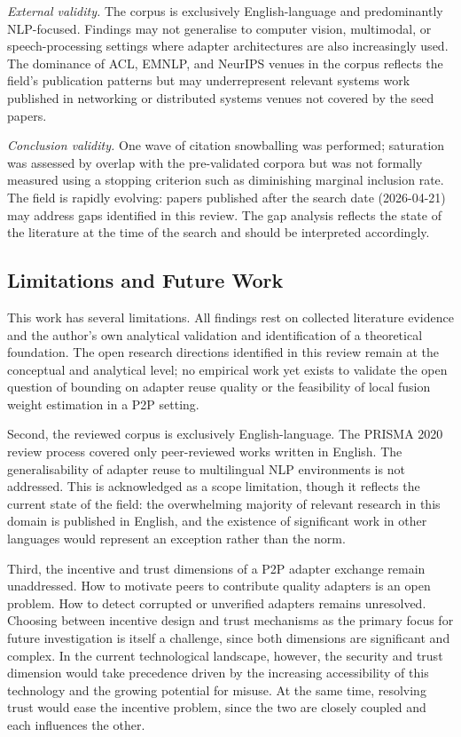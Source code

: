 \textit{External validity.}
The corpus is exclusively English-language and predominantly NLP-focused. Findings may not generalise to computer vision, multimodal, or speech-processing settings where adapter architectures are also increasingly used. The dominance of ACL, EMNLP, and NeurIPS venues in the corpus reflects the field's publication patterns but may underrepresent relevant systems work published in networking or distributed systems venues not covered by the seed papers.

\textit{Conclusion validity.}
One wave of citation snowballing was performed; saturation was assessed by overlap with the pre-validated corpora but was not formally measured using a stopping criterion such as diminishing marginal inclusion rate. The field is rapidly evolving: papers published after the search date (2026-04-21) may address gaps identified in this review. The gap analysis reflects the state of the literature at the time of the search and should be interpreted accordingly.

\subsection{Limitations and Future Work}
\label{sec:conclusion:limitations}

This work has several limitations. All findings rest on collected 
literature evidence and the author's own analytical validation and 
identification of a theoretical foundation. The open research directions identified in this review remain at the conceptual and analytical level; no empirical work yet exists to validate the open question of bounding on adapter reuse quality or the feasibility of local fusion weight estimation in a P2P setting.

Second, the reviewed corpus is exclusively English-language. The PRISMA 2020 
review process covered only peer-reviewed works written in English. The 
generalisability of adapter reuse to multilingual NLP environments is not 
addressed. This is acknowledged as a scope limitation, though it reflects 
the current state of the field: the overwhelming majority of relevant 
research in this domain is published in English, and the existence of 
significant work in other languages would represent an exception rather 
than the norm.

Third, the incentive and trust dimensions of a P2P adapter exchange remain
unaddressed. How to motivate peers to contribute quality adapters is an 
open problem. How to detect corrupted or unverified adapters remains 
unresolved. Choosing between incentive design and trust mechanisms as the 
primary focus for future investigation is itself a challenge, since both 
dimensions are significant and complex. In the current technological 
landscape, however, the security and trust dimension would take precedence driven by the increasing accessibility of this technology and the 
growing potential for misuse. At the same time, resolving trust would 
ease the incentive problem, since the two are closely coupled and each 
influences the other.

